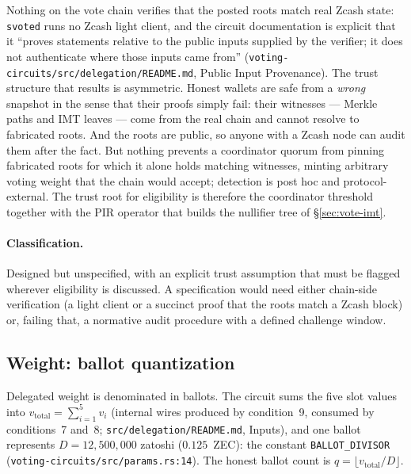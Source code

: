 \documentclass[11pt,a4paper]{article}
\theoremstyle{definition}
\begin{document}
Nothing on the vote chain verifies that the posted roots match real Zcash
state: \texttt{svoted} runs no Zcash light client, and the circuit
documentation is explicit that it ``proves statements relative to the
public inputs supplied by the verifier; it does not authenticate where
those inputs came from''
(\texttt{voting-circuits/src/delegation/README.md}, Public Input
Provenance). The trust structure that results is asymmetric. Honest
wallets are safe from a \emph{wrong} snapshot in the sense that their
proofs simply fail: their witnesses --- Merkle paths and IMT leaves ---
come from the real chain and cannot resolve to fabricated roots. And the
roots are public, so anyone with a Zcash node can audit them after the
fact. But nothing prevents a coordinator quorum from pinning fabricated
roots for which it alone holds matching witnesses, minting arbitrary
voting weight that the chain would accept; detection is post hoc and
protocol-external. The trust root for eligibility is therefore the
coordinator threshold together with the PIR operator that builds the
nullifier tree of \S\ref{sec:vote-imt}.

\paragraph{Classification.} Designed but unspecified, with an explicit
trust assumption that must be flagged wherever eligibility is discussed. A
specification would need either chain-side verification (a light client or
a succinct proof that the roots match a Zcash block) or, failing that, a
normative audit procedure with a defined challenge window.

\subsection{Weight: ballot quantization}\label{sec:vote-weight}

Delegated weight is denominated in ballots. The circuit sums the five slot
values into $v_{\mathrm{total}} = \sum_{i=1}^{5} v_i$ (internal wires
produced by condition~9, consumed by conditions~7 and~8;
\texttt{src/delegation/README.md}, Inputs), and one ballot represents
$D = 12{,}500{,}000$ zatoshi ($0.125$~ZEC): the constant
\texttt{BALLOT\_DIVISOR} (\texttt{voting-circuits/src/params.rs:14}). The
honest ballot count is $q = \lfloor v_{\mathrm{total}} / D \rfloor$.
\end{document}
